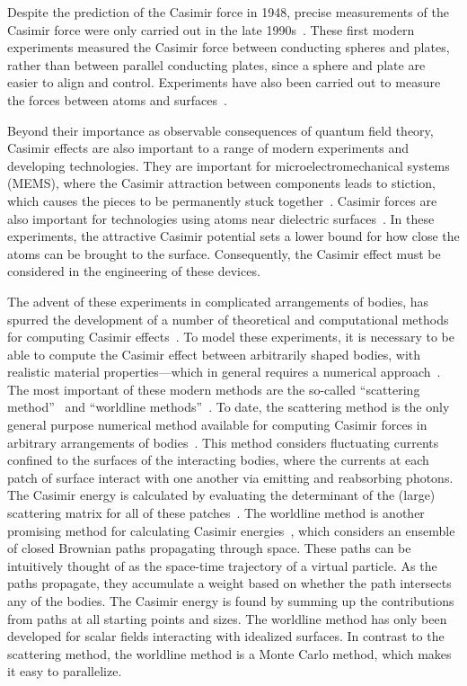Despite the prediction of the Casimir force in 1948, precise measurements of the Casimir force were only
carried out in the late 1990s~\cite{Lamoreaux1997,Mohideen1998}.  
These first modern experiments measured the Casimir force between conducting spheres and plates, 
rather than between parallel conducting plates, since a sphere and plate are easier to align and control. 
Experiments have also been carried out to measure the forces between atoms and surfaces~\cite{Sukenik1993,Perreault2005,Harber2005}.

Beyond their importance as observable consequences of quantum field theory, Casimir effects are also 
important to a range of modern experiments and developing technologies.
They are important for microelectromechanical systems (MEMS), where the Casimir attraction between components 
leads to stiction, which causes the pieces to be permanently stuck together~\cite{Buks2001}.  
Casimir forces are also important for technologies using atoms near dielectric surfaces~\cite{Folman2000,Alton2011, Hung2013}.
In these experiments, the attractive Casimir potential sets a lower bound for how
close the atoms can be brought to the surface.  Consequently, the Casimir effect must be considered in the engineering 
of these devices.

The advent of these experiments in complicated arrangements of bodies, has spurred the development
of a number of theoretical and computational methods for computing Casimir effects~\cite{Dalvit2011,Bordag2009}. 
To model these experiments, it is necessary to be able to compute the Casimir effect between arbitrarily shaped bodies, with 
realistic material properties---which in general requires a numerical approach~\cite{Johnson2011}.
The most important of these modern methods are the so-called ``scattering method''~\cite{Lambrecht2006,Rahi2009,Reid2009}
 and ``worldline methods''~\cite{Gies2003}.
To date, the scattering method is the only general purpose numerical method available for computing
Casimir forces in arbitrary arrangements of bodies~\cite{Reid2009,Reid2011,Reid2013}.  
This method considers fluctuating currents confined to the surfaces of the interacting bodies,
where the currents at each patch of surface interact with one another via emitting and reabsorbing photons.
The Casimir energy is calculated by evaluating the determinant of the (large) scattering matrix for all of these patches~\cite{Reid2011}.  
The worldline method is another promising method for calculating Casimir energies~\cite{Gies2003},
which considers an ensemble of closed Brownian paths propagating through space.
These paths can be intuitively thought of as the space-time trajectory of a virtual particle.
As the paths propagate, they accumulate a weight based on whether the path intersects any of the 
bodies.  The Casimir energy is found by summing up the contributions from paths at all starting points
and sizes.   
The worldline method has only been developed for scalar fields interacting with idealized surfaces.
In contrast to the scattering method, the worldline method is a Monte Carlo method, which makes it 
easy to parallelize.  

